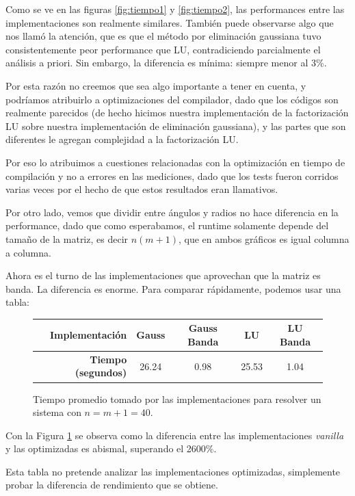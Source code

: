 Como se ve en las figuras \ref{fig:tiempo1} y \ref{fig:tiempo2}, las performances entre las implementaciones son realmente similares. También puede observarse algo que nos llamó la atención, que es que el método por eliminación gaussiana tuvo consistentemente peor performance que LU, contradiciendo parcialmente el análisis a priori. Sin embargo, la diferencia es mínima: siempre menor al 3\%.

Por esta razón no creemos que sea algo importante a tener en cuenta, y podríamos atribuirlo a optimizaciones del compilador, dado que los códigos son realmente parecidos (de hecho hicimos nuestra implementación de la factorización LU sobre nuestra implementación de eliminación gaussiana), y las partes que son diferentes le agregan complejidad a la factorización LU.

Por eso lo atribuimos a cuestiones relacionadas con la optimización en tiempo de compilación y no a errores en las mediciones, dado que los tests fueron corridos varias veces por el hecho de que estos resultados eran llamativos.


Por otro lado, vemos que dividir entre ángulos y radios no hace diferencia en la performance, dado que como esperabamos, el runtime solamente depende del tamaño de la matriz, es decir $n (m+1)$, que en ambos gráficos es igual columna a columna.


Ahora es el turno de las implementaciones que aprovechan que la matriz es banda.
La diferencia es enorme. Para comparar rápidamente, podemos usar una tabla:


\begin{figure}[H]
\centering
\begin{tabular}{|r | c  c  c  c|}
\hline
  \textbf{Implementación} & Gauss & Gauss Banda & LU & LU Banda\\ \hline
  \textbf{Tiempo (segundos)} & 26.24 & 0.98 & 25.53 & 1.04 \\
\hline
\end{tabular}

  \caption{\footnotesize{Tiempo promedio tomado por las implementaciones para resolver un sistema con $n = m+1 = 40$.}}
  \label{fig:tiempocomp}
\end{figure}

Con la Figura \ref{fig:tiempocomp} se observa como la diferencia entre las implementaciones \emph{vanilla} y las optimizadas es abismal, superando el 2600\%.

Esta tabla no pretende analizar las implementaciones optimizadas, simplemente probar la diferencia de rendimiento que se obtiene.

